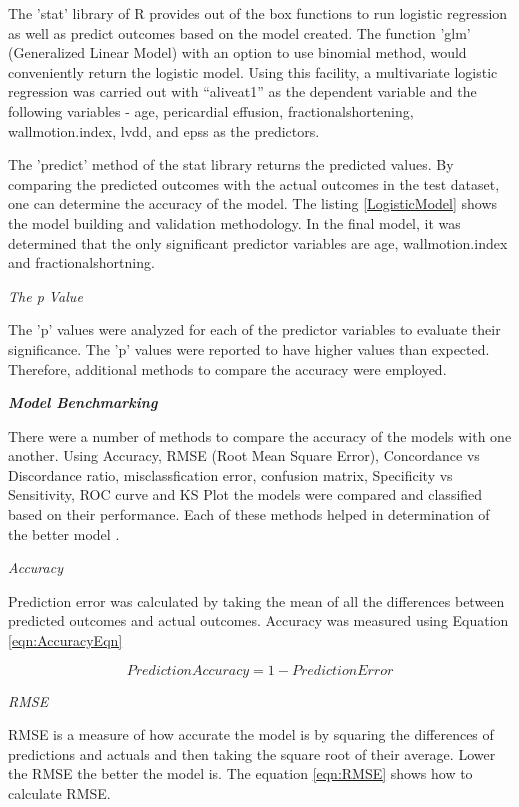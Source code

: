 \documentclass[11pt]{article}
\begin{document}
The 'stat' library of R provides out of the box functions to run logistic regression as well as predict outcomes based on the model created. The function 'glm' (Generalized Linear Model) with an option to use binomial method, would conveniently return the logistic model. Using this facility, a multivariate logistic regression was carried out with “aliveat1” as the dependent variable and the following variables - age, pericardial effusion, fractionalshortening, wallmotion.index, lvdd, and epss as the predictors.


The 'predict' method of the stat library returns the predicted values. By comparing the predicted outcomes with the actual outcomes in the test dataset, one can determine the accuracy of the model.  The listing \ref{LogisticModel} shows the model building and validation methodology. In the final model, it was determined that the only significant predictor variables are age, wallmotion.index and fractionalshortning.

{\it The p Value}

The 'p' values were analyzed for each of the predictor variables to evaluate their significance. The 'p' values were reported to have higher values than expected. Therefore, additional methods to compare the accuracy were employed.

{\textbf {\emph{Model Benchmarking}}}

There were a number of methods to compare the accuracy of the models with one another. Using Accuracy, RMSE (Root Mean Square Error), Concordance vs Discordance ratio, misclassfication error, confusion matrix, Specificity vs Sensitivity, ROC curve and KS Plot the models were compared and classified based on their performance. Each of these methods helped in determination of the better model \cite{errormetrics}.

{\it Accuracy}

Prediction error was calculated by taking the mean of all the differences between predicted outcomes and actual outcomes. Accuracy was measured using Equation \ref{eqn:AccuracyEqn}

\begin{equation}
\label{eqn:AccuracyEqn}
    PredictionAccuracy = 1 - PredictionError
\end{equation}

{\it RMSE}

RMSE is a measure of how accurate the model is by squaring the differences of predictions and actuals and then taking the square root of their average. Lower the RMSE the better the model is. The equation \ref{eqn:RMSE} shows how to calculate RMSE. 
\end{document}
